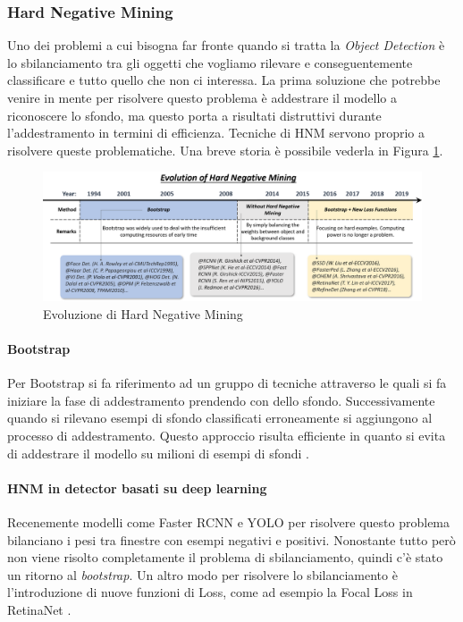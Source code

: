 \subsubsection{Hard Negative Mining}
Uno dei problemi a cui bisogna far fronte quando si tratta la \textit{Object Detection} è lo sbilanciamento tra gli oggetti che vogliamo rilevare e conseguentemente classificare e tutto quello che non ci interessa. La prima soluzione che potrebbe venire in mente per risolvere questo problema è addestrare il modello a riconoscere lo sfondo, ma questo porta a risultati distruttivi durante l'addestramento in termini di efficienza. Tecniche di \ac{HNM} servono proprio a risolvere queste problematiche. Una breve storia è possibile vederla in Figura \ref{fig:HNM_history}.
\begin{figure}
    \centering
    \includegraphics[width=\textwidth]{images/evol-hardnegmining.png}
    \caption{Evoluzione di Hard Negative Mining \cite{DBLP:journals/corr/abs-1905-05055}}
    \label{fig:HNM_history}
\end{figure}
\paragraph{Bootstrap}
Per Bootstrap si fa riferimento ad un gruppo di tecniche attraverso le quali si fa iniziare la fase di addestramento prendendo con dello sfondo. Successivamente quando si rilevano esempi di sfondo classificati erroneamente si aggiungono al processo di addestramento. Questo approccio risulta efficiente in quanto si evita di addestrare il modello su milioni di esempi di sfondi \cite{viola2001rapid, papageorgiou1998general, rowley1996human}.
\paragraph{HNM in detector basati su deep learning}
Recenemente modelli come Faster RCNN e \ac{YOLO} per risolvere questo problema bilanciano i pesi tra finestre con esempi negativi e positivi. Nonostante tutto però non viene risolto completamente il problema di sbilanciamento, quindi c'è stato un ritorno al \textit{bootstrap}. Un altro modo per risolvere lo sbilanciamento è l'introduzione di nuove funzioni di Loss, come ad esempio la Focal Loss in RetinaNet \cite{lin2017focal}. 




